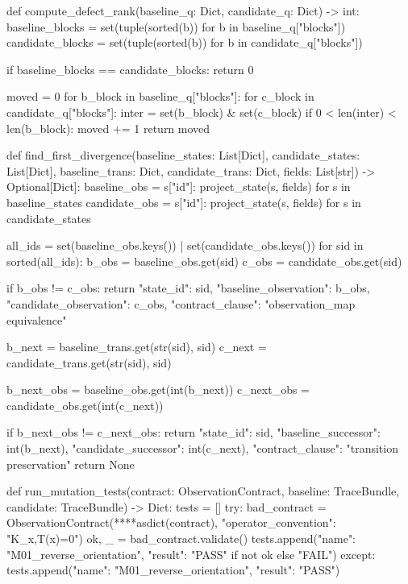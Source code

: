 def compute_defect_rank(baseline_q: Dict, candidate_q: Dict) -> int:
    baseline_blocks = set(tuple(sorted(b)) for b in baseline_q["blocks"])
    candidate_blocks = set(tuple(sorted(b)) for b in candidate_q["blocks"])
    
    if baseline_blocks == candidate_blocks:
        return 0
    
    moved = 0
    for b_block in baseline_q["blocks"]:
        for c_block in candidate_q["blocks"]:
            inter = set(b_block) & set(c_block)
            if 0 < len(inter) < len(b_block):
                moved += 1
    return moved

def find_first_divergence(baseline_states: List[Dict], candidate_states: List[Dict], 
                           baseline_trans: Dict, candidate_trans: Dict,
                           fields: List[str]) -> Optional[Dict]:
    baseline_obs = {s["id"]: project_state(s, fields) for s in baseline_states}
    candidate_obs = {s["id"]: project_state(s, fields) for s in candidate_states}
    
    all_ids = set(baseline_obs.keys()) | set(candidate_obs.keys())
    for sid in sorted(all_ids):
        b_obs = baseline_obs.get(sid)
        c_obs = candidate_obs.get(sid)
        
        if b_obs != c_obs:
            return {
                "state_id": sid,
                "baseline_observation": b_obs,
                "candidate_observation": c_obs,
                "contract_clause": "observation_map equivalence"
            }
        
        b_next = baseline_trans.get(str(sid), sid)
        c_next = candidate_trans.get(str(sid), sid)
        
        b_next_obs = baseline_obs.get(int(b_next))
        c_next_obs = candidate_obs.get(int(c_next))
        
        if b_next_obs != c_next_obs:
            return {
                "state_id": sid,
                "baseline_successor": int(b_next),
                "candidate_successor": int(c_next),
                "contract_clause": "transition preservation"
            }
    return None

def run_mutation_tests(contract: ObservationContract, baseline: TraceBundle, 
                       candidate: TraceBundle) -> Dict:
    tests = []
    try:
        bad_contract = ObservationContract(**{**asdict(contract), "operator_convention": "K_x,T(x)=0"})
        ok, _ = bad_contract.validate()
        tests.append({"name": "M01_reverse_orientation", "result": "PASS" if not ok else "FAIL"})
    except:
        tests.append({"name": "M01_reverse_orientation", "result": "PASS"})
    
